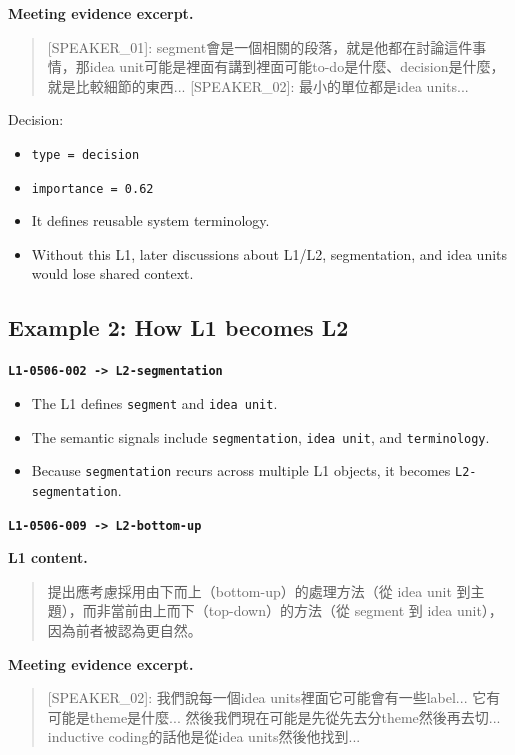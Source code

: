 \documentclass[11pt,a4paper]{article}
\newcommand{\code}[1]{{\footnotesize\texttt{#1}}}
\begin{document}
\textbf{Meeting evidence excerpt.}

\begin{quote}
[SPEAKER\_01]: segment會是一個相關的段落，就是他都在討論這件事情，那idea unit可能是裡面有講到裡面可能to-do是什麼、decision是什麼，就是比較細節的東西... [SPEAKER\_02]: 最小的單位都是idea units...
\end{quote}

Decision:

\begin{itemize}
  \item \code{type = decision}
  \item \code{importance = 0.62}
  \item It defines reusable system terminology.
  \item Without this L1, later discussions about L1/L2, segmentation, and idea units would lose shared context.
\end{itemize}

\subsection{Example 2: How L1 becomes L2}

\textbf{\code{L1-0506-002 -> L2-segmentation}}

\begin{itemize}
  \item The L1 defines \code{segment} and \code{idea unit}.
  \item The semantic signals include \code{segmentation}, \code{idea unit}, and \code{terminology}.
  \item Because \code{segmentation} recurs across multiple L1 objects, it becomes \code{L2-segmentation}.
\end{itemize}

\textbf{\code{L1-0506-009 -> L2-bottom-up}}

\textbf{L1 content.}

\begin{quote}
提出應考慮採用由下而上（bottom-up）的處理方法（從 idea unit 到主題），而非當前由上而下（top-down）的方法（從 segment 到 idea unit），因為前者被認為更自然。
\end{quote}

\textbf{Meeting evidence excerpt.}

\begin{quote}
[SPEAKER\_02]: 我們說每一個idea units裡面它可能會有一些label... 它有可能是theme是什麼... 然後我們現在可能是先從先去分theme然後再去切... inductive coding的話他是從idea units然後他找到...
\end{quote}
\end{document}
